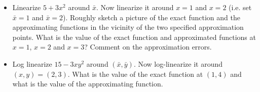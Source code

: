 \documentclass[authoryear,11pt]{elsarticle}
\begin{document}
\begin{itemize}
\item	Linearize $5 + 3x^{2}$ around $\bar{x}$. Now linearize it around $x=1$ and $x=2$ (i.e. set $\bar{x}=1$ and $\bar{x}=2$). Roughly sketch a picture of the exact function and the approximating functions in the vicinity of the two specified approximation points. What is the value of the exact function and approximated functions at $x=1$, $x=2$ and $x=3$? Comment on the approximation errors.
\item	Log linearize $15 - 3xy^2$ around $(\bar{x},\bar{y})$. Now log-linearize it around $(x,y)=(2,3)$. What is the value of the exact function at $(1,4)$ and what is the value of the approximating function.
\end{itemize}

%
%
%
\end{document}
